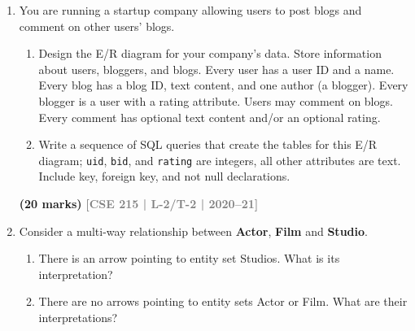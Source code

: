 \documentclass[12pt,a3paper]{article}
\newcommand{\yr}[1]{\hfill\textcolor{gray}{\small\textbf{[#1]}}}
\newcommand{\mk}[1]{\textcolor{orange!70!black}{\small\textbf{(#1 marks)}}}
\begin{document}
\begin{enumerate}
\begin{enumerate}
  \item Enroll is a strong entity set.
  \item All teachers must teach courses.
  \item All students must enroll in courses.
  \item All courses must be enrolled by students.
  \item All courses must be taught by teachers.
  \item Each course is taught by only one teacher.
  \item Each course is enrolled by only one student.
  \item Each teacher may teach many courses.
  \item Each student can enroll in many courses.
  \item Teacher is a relationship set.
\end{enumerate}
\mk{10} \yr{CSE 215 | L-2/T-2 | 2020--21}

\item You are running a startup company allowing users to post blogs and comment on other users' blogs.
\begin{enumerate}
  \item Design the E/R diagram for your company's data. Store information about users, bloggers, and blogs. Every user has a user ID and a name. Every blog has a blog ID, text content, and one author (a blogger). Every blogger is a user with a rating attribute. Users may comment on blogs. Every comment has optional text content and/or an optional rating.
  \item Write a sequence of SQL queries that create the tables for this E/R diagram; \texttt{uid}, \texttt{bid}, and \texttt{rating} are integers, all other attributes are text. Include key, foreign key, and not null declarations.
\end{enumerate}
\mk{20} \yr{CSE 215 | L-2/T-2 | 2020--21}

\item Consider a multi-way relationship between \textbf{Actor}, \textbf{Film} and \textbf{Studio}.
\begin{enumerate}
  \item There is an arrow pointing to entity set Studios. What is its interpretation?
  \item There are no arrows pointing to entity sets Actor or Film. What are their interpretations?
\end{enumerate}
\begin{center}
  \begin{tikzpicture}[
        thick,
        entity/.style={draw, rectangle, minimum width=2.5cm, minimum height=0.8cm, align=center},
        relationship/.style={draw, diamond, aspect=1.5, minimum width=2.5cm, minimum height=1.5cm, align=center, pattern=crosshatch dots, pattern color=gray}
    ]
    

\end{tikzpicture}
\end{center}
\end{enumerate}
\end{document}

